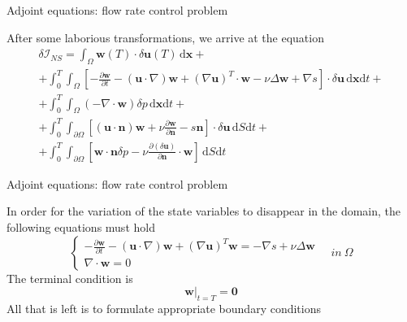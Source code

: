 \documentclass{beamer}
\begin{document}
\begin{frame}{Adjoint equations: flow rate control problem}

	After some laborious transformations, we arrive at the equation
	\begin{multline}
		\delta\mathcal{I}_{NS}=\int_{\Omega}\mathbf{w}(T)\cdot\delta\mathbf{u}\left(T\right)\,\mathrm{d}\mathbf{x}+\\
		+\int_{0}^{T}\int_{\Omega}\left[-\frac{\partial\mathbf{w}}{\partial t}-\left(\mathbf{u}\cdot\nabla\right)\mathbf{w}+\left(\nabla\mathbf{u}\right)^{T}\cdot\mathbf{w}-\nu\Delta\mathbf{w}+\nabla s\right]\cdot\delta\mathbf{u}\,\mathrm{d}\mathbf{x}\mathrm{d}t+\\
		+\int_{0}^{T}\int_{\Omega}(-\nabla\cdot\mathbf{w})\delta p\,\mathrm{d}\mathbf{x}\mathrm{d}t+\\
		+\int_{0}^{T}\int_{\partial\Omega}\left[\left(\mathbf{u}\cdot\mathbf{n}\right)\mathbf{w}+\nu\frac{\partial\mathbf{w}}{\partial\mathbf{n}}-s\mathbf{n}\right]\cdot\delta\mathbf{u}\,\mathrm{d}S\mathrm{d}t+\\
		+\int_{0}^{T}\int_{\partial\Omega}\left[\mathbf{w}\cdot\mathbf{n}\delta p-\nu\frac{\partial\left(\delta\mathbf{u}\right)}{\partial\mathbf{n}}\cdot\mathbf{w}\right]\,\mathrm{d}S\mathrm{d}t
	\end{multline}

\end{frame}

\begin{frame}{Adjoint equations: flow rate control problem}
	
	In order for the variation of the state variables to disappear in the domain, the following equations must hold
	\begin{equation}
		\left\{ \begin{array}{c}
		-\frac{\partial\mathbf{w}}{\partial t}-\left(\mathbf{u}\cdot\nabla\right)\mathbf{w}+\left(\nabla\mathbf{u}\right)^{T}\mathbf{w}=-\nabla s+\nu\Delta\mathbf{w}\\
		\nabla\cdot\mathbf{w}=0
		\end{array}\right.\quad in\:\Omega
	\end{equation}
	The terminal condition is
	\begin{equation}
		\left.\mathbf{w}\right|_{t=T}=\mathbf{0}
	\end{equation}
	All that is left is to formulate appropriate boundary conditions
	
\end{frame}
\end{document}
